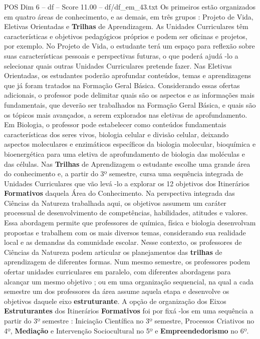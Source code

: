 \begin{textsample}{POS Dim 6 – df – Score 11.00 – df/df\_em\_43.txt}
Os primeiros estão organizados em quatro áreas de conhecimento, e as demais, em três grupos : Projeto de Vida, Eletivas Orientadas e \textbf{Trilhas} de Aprendizagem.
As Unidades Curriculares têm características e objetivos pedagógicos próprios e podem ser oficinas e projetos, por exemplo.
No Projeto de Vida, o estudante terá um espaço para reflexão sobre suas características pessoais e perspectivas futuras, o que poderá ajudá -lo a selecionar quais outras Unidades Curriculares pretende fazer.
Nas Eletivas Orientadas, os estudantes poderão aprofundar conteúdos, temas e aprendizagens que já foram tratados na Formação Geral Básica.
Considerando essas ofertas adicionais, o professor pode delimitar quais são os aspectos e as informações mais fundamentais, que deverão ser trabalhados na Formação Geral Básica, e quais são os tópicos mais avançados, a serem explorados nas eletivas de aprofundamento.
Em Biologia, o professor pode estabelecer como conteúdos fundamentais características dos seres vivos, biologia celular e divisão celular, deixando aspectos moleculares e enzimáticos específicos da biologia molecular, bioquímica e bioenergética para uma eletiva de aprofundamento de biologia das moléculas e das células.
Nas \textbf{Trilhas} de Aprendizagem o estudante escolhe uma grande área do conhecimento e, a partir do 3º semestre, cursa uma sequência integrada de Unidades Curriculares que vão levá -lo a explorar os 12 objetivos dos Itinerários \textbf{Formativos} daquela Área do Conhecimento.
Na perspectiva integrada das Ciências da Natureza trabalhada aqui, os objetivos assumem um caráter processual de desenvolvimento de competências, habilidades, atitudes e valores.
Essa abordagem permite que professores de química, física e biologia desenvolvam propostas e trabalhem com os mais diversos temas, considerando sua realidade local e as demandas da comunidade escolar.
Nesse contexto, os professores de Ciências da Natureza podem articular os planejamentos das \textbf{trilhas} de aprendizagem de diferentes formas.
Num mesmo semestre, os professores podem ofertar unidades curriculares em paralelo, com diferentes abordagens para alcançar um mesmo objetivo ; ou em uma organização sequencial, na qual a cada semestre um dos professores da área assume aquela etapa e desenvolve os objetivos daquele eixo \textbf{estruturante}.
A opção de organização dos Eixos \textbf{Estruturantes} dos Itinerários \textbf{Formativos} foi por fixá -los em uma sequência a partir do 3º semestre : Iniciação Científica no 3º semestre, Processos Criativos no 4º, \textbf{Mediação} e Intervenção Sociocultural no 5º e \textbf{Empreendedorismo} no 6º.

\end{textsample}
